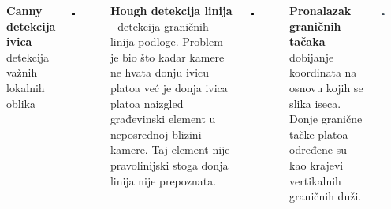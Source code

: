 \documentclass[24pt, a0paper, portrait]{tikzposter}
\begin{document}
\begin{columns}
{	\begin{center}
	\textbf{Canny detekcija ivica} - detekcija važnih lokalnih oblika
	\end{center}
            \begin{tikzfigure}
                \includegraphics[width=0.13\textwidth]{assets/podloga-canny.png}
            \end{tikzfigure}

	\begin{center}
	\textbf{Hough detekcija linija} - detekcija graničnih linija podloge. Problem je bio što kadar kamere ne hvata donju ivicu platoa već je donja ivica platoa naizgled građevinski element u neposrednoj blizini kamere. Taj element nije pravolinijski stoga donja linija nije prepoznata.
	\end{center}
            \begin{tikzfigure}
                \includegraphics[width=0.13\textwidth]{assets/podloga-hough.png}
            \end{tikzfigure}

	\begin{center}
	\textbf{Pronalazak graničnih tačaka} - dobijanje koordinata na osnovu kojih se slika iseca. Donje granične tačke platoa određene su kao krajevi vertikalnih graničnih duži.
	\end{center}
            \begin{tikzfigure}
                \includegraphics[width=0.13\textwidth]{assets/podloga-granicne-tacke.png}
            \end{tikzfigure}

	}


\end{columns}
\end{document}

